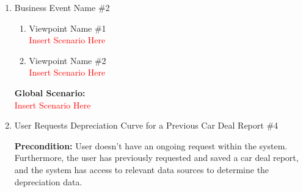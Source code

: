 \documentclass[]{article}
\begin{document}
\begin{enumerate}[{\bf {BE}1.}]
	\item Business Event Name \#2
	\begin{enumerate}[{\bf VP1.}]
		\item Viewpoint Name \#1 \\
		\textcolor{red}{Insert Scenario Here}
		\item Viewpoint Name \#2 \\
		\textcolor{red}{Insert Scenario Here}
	\end{enumerate}
	{\bf Global Scenario:}\\
	\textcolor{red}{Insert Scenario Here}

	\item User Requests Depreciation Curve for a Previous Car Deal Report \#4
	
	{\bf Precondition:} User doesn't have an ongoing request within the system. Furthermore, the user has previously requested and saved a car deal report, and the system 
	has access to relevant data sources to determine the depreciation data.


\end{enumerate}
\end{document}
